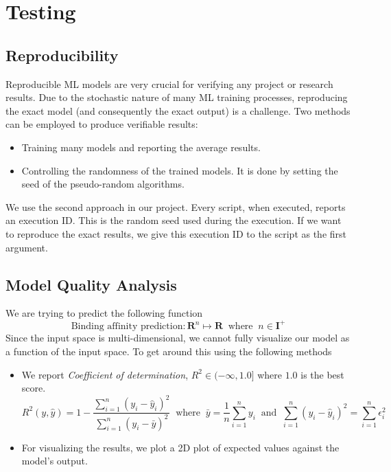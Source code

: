 \documentclass[11pt]{article}
\begin{document}
\section{Testing}
\subsection{Reproducibility}
Reproducible ML models are very crucial for verifying any project or research results. Due to the stochastic nature of many ML training processes, reproducing the exact model (and consequently the exact output) is a challenge. Two methods can be employed to produce verifiable results:
\begin{itemize}
\item Training many models and reporting the average results.
\item Controlling the randomness of the trained models. It is done by setting the seed of the pseudo-random algorithms.
\end{itemize}

We use the second approach in our project. Every script, when executed, reports an execution ID. This is the random seed used during the execution. If we want to reproduce the exact results, we give this execution ID to the script as the first argument.

\subsection{Model Quality Analysis}
We are trying to predict the following function
$$ \textrm{Binding affinity prediction} : \mathbf{R}^n \mapsto \mathbf{R} \;\; \textrm{where} \;\; n \in \mathbf{I}^+$$
Since the input space is multi-dimensional, we cannot fully visualize our model as a function of the input space.
To get around this using the following methods
\begin{itemize}
\item We report \textit{Coefficient of determination}, $R^2  \in (- \infty, 1.0]$ where $1.0$ is the best score. \cite{r_squared_score}
$$R^2(y, \hat{y}) = 1 - \frac{\sum_{i=1}^{n} (y_i - \hat{y}_i)^2}{\sum_{i=1}^{n} (y_i - \bar{y})^2} \;\; \textrm{where} \;\; \bar{y} = \frac{1}{n} \sum_{i=1}^{n} y_i \;\;
\textrm{and} \;\; \sum_{i=1}^{n} (y_i - \hat{y}_i)^2 = \sum_{i=1}^{n} \epsilon_i^2$$

\item For visualizing the results,  we plot a 2D plot of expected values against the model's output. 
\end{itemize}
\end{document}
